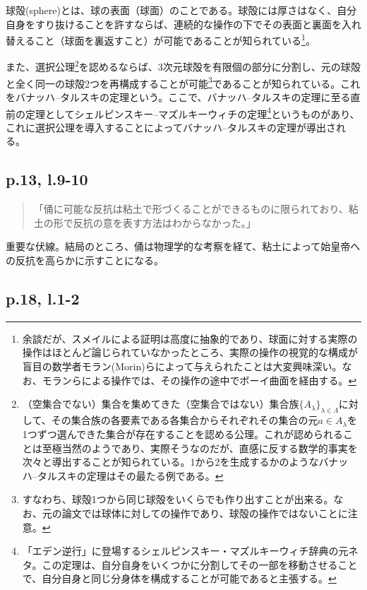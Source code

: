 \documentclass[10pt, a5paper, twoside]{jsarticle}
\theoremstyle{definition}
\begin{document}
		球殻(sphere)とは、球の表面（球面）のことである。球殻には厚さはなく、自分自身をすり抜けることを許すならば、連続的な操作の下でその表面と裏面を入れ替えること（球面を裏返すこと）が可能であることが知られている\cite{smale}\footnote{余談だが、スメイルによる証明\cite{smale}は高度に抽象的であり、球面に対する実際の操作はほとんど論じられていなかったところ、実際の操作の視覚的な構成が盲目の数学者モラン(Morin)らによって与えられたことは大変興味深い。なお、モランらによる操作では、その操作の途中でボーイ曲面を経由する。}。

		また、選択公理\footnote{（空集合でない）集合を集めてきた（空集合ではない）集合族$ { \{ A_{\lambda} \} }_{\lambda \in \Lambda}$に対して、その集合族の各要素である各集合からそれぞれその集合の元$ a \in A_\lambda $を1つずつ選んできた集合が存在することを認める公理\cite{hara}。これが認められることは至極当然のようであり、実際そうなのだが、直感に反する数学的事実を次々と導出することが知られている。1から2を生成するかのようなバナッハ--タルスキの定理はその最たる例である。}を認めるならば、3次元球殻を有限個の部分に分割し、元の球殻と全く同一の球殻2つを再構成することが可能\footnote{すなわち、球殻1つから同じ球殻をいくらでも作り出すことが出来る。なお、元の論文\cite{bantar}では球体に対しての操作であり、球殻の操作ではないことに注意。}であることが知られている。これをバナッハ--タルスキの定理という。ここで、バナッハ--タルスキの定理に至る直前の定理としてシェルピンスキー--マズルキーウィチの定理\footnote{「エデン逆行」に登場するシェルピンスキー・マズルキーウィチ辞典の元ネタ。この定理は、自分自身をいくつかに分割してその一部を移動させることで、自分自身と同じ分身体を構成することが可能であると主張する。}というものがあり、これに選択公理を導入することによってバナッハ--タルスキの定理が導出される\cite{math}。

		\subsection{p.13, l.9-10}\label{eisei1}

		\begin{quote}

			「俑に可能な反抗は粘土で形づくることができるものに限られており、粘土の形で反抗の意を表す方法はわからなかった。」

		\end{quote}

		重要な伏線。結局のところ、俑は物理学的な考察を経て、粘土によって始皇帝への反抗を高らかに示すことになる。

		\subsection{p.18, l.1-2}
\end{document}
